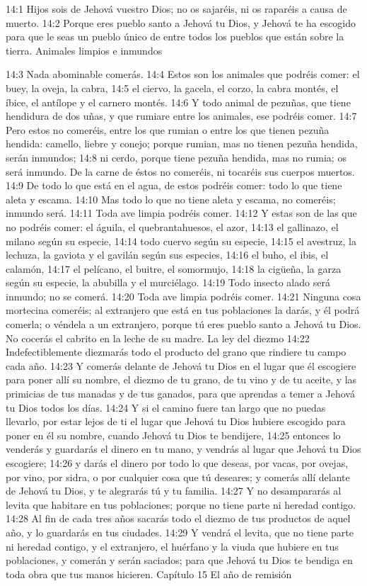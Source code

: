 14:1 Hijos sois de Jehová vuestro Dios; no os sajaréis, ni os raparéis a causa de muerto. 
14:2 Porque eres pueblo santo a Jehová tu Dios, y Jehová te ha escogido para que le seas un pueblo único de entre todos los pueblos que están sobre la tierra.  
Animales limpios e inmundos  
 
14:3 Nada abominable comerás.  
14:4 Estos son los animales que podréis comer: el buey, la oveja, la cabra,  
14:5 el ciervo, la gacela, el corzo, la cabra montés, el íbice, el antílope y el carnero montés.  
14:6 Y todo animal de pezuñas, que tiene hendidura de dos uñas, y que rumiare entre los animales, ese podréis comer.  
14:7 Pero estos no comeréis, entre los que rumian o entre los que tienen pezuña hendida: camello, liebre y conejo; porque rumian, mas no tienen pezuña hendida, serán inmundos;  
14:8 ni cerdo, porque tiene pezuña hendida, mas no rumia; os será inmundo. De la carne de éstos no comeréis, ni tocaréis sus cuerpos muertos.  
14:9 De todo lo que está en el agua, de estos podréis comer: todo lo que tiene aleta y escama.  
14:10 Mas todo lo que no tiene aleta y escama, no comeréis; inmundo será.  
14:11 Toda ave limpia podréis comer.  
14:12 Y estas son de las que no podréis comer: el águila, el quebrantahuesos, el azor,  
14:13 el gallinazo, el milano según su especie,  
14:14 todo cuervo según su especie,  
14:15 el avestruz, la lechuza, la gaviota y el gavilán según sus especies, 
14:16 el buho, el ibis, el calamón,  
14:17 el pelícano, el buitre, el somormujo,  
14:18 la cigüeña, la garza según su especie, la abubilla y el murciélago.  
14:19 Todo insecto alado será inmundo; no se comerá.  
14:20 Toda ave limpia podréis comer.  
14:21 Ninguna cosa mortecina comeréis; al extranjero que está en tus poblaciones la darás, y él podrá comerla; o véndela a un extranjero, porque tú eres pueblo santo a Jehová tu Dios. No cocerás el cabrito en la leche de su madre.  
La ley del diezmo  
14:22 Indefectiblemente diezmarás  todo el producto del grano que rindiere tu campo cada año.  
14:23 Y comerás delante de Jehová tu Dios en el lugar que él escogiere para poner allí su nombre, el diezmo de tu grano, de tu vino y de tu aceite, y las primicias de tus manadas y de tus ganados, para que aprendas a temer a Jehová tu Dios todos los días.  
14:24 Y si el camino fuere tan largo que no puedas llevarlo, por estar lejos de ti el lugar que Jehová tu Dios hubiere escogido para poner en él su nombre, cuando Jehová tu Dios te bendijere,  
14:25 entonces lo venderás y guardarás el dinero en tu mano, y vendrás al lugar que Jehová tu Dios escogiere;  
14:26 y darás el dinero por todo lo que deseas, por vacas, por ovejas, por vino, por sidra, o por cualquier cosa que tú deseares; y comerás allí delante de Jehová tu Dios, y te alegrarás tú y tu familia.  
14:27 Y no desampararás al levita que habitare en tus poblaciones; porque no tiene parte ni heredad contigo.  
14:28 Al fin de cada tres años sacarás todo el diezmo de tus productos de aquel año, y lo guardarás en tus ciudades.  
14:29 Y vendrá el levita, que no tiene parte ni heredad contigo, y el extranjero, el huérfano y la viuda que hubiere en tus poblaciones, y comerán y serán saciados; para que Jehová tu Dios te bendiga en toda obra que tus manos hicieren.  
Capítulo 15
El año de remisión  

